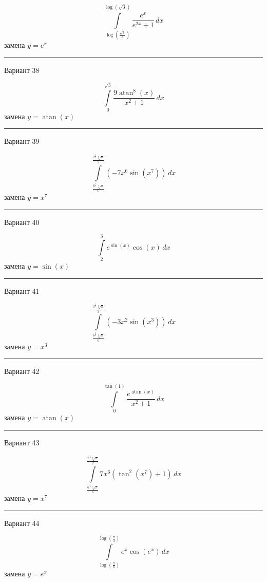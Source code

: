 \documentclass[11pt]{report}
\begin{document}
$$\int\limits_{\log{\left(\frac{\sqrt{3}}{3} \right)}}^{\log{\left(\sqrt{3} \right)}} \frac{e^{x}}{e^{2 x} + 1}\, dx$$
замена $y = e^{x}$



\rule{\textwidth}{.2mm}

Вариант 38

$$\int\limits_{0}^{\sqrt{3}} \frac{9 \operatorname{atan}^{8}{\left(x \right)}}{x^{2} + 1}\, dx$$
замена $y = \operatorname{atan}{\left(x \right)}$



\rule{\textwidth}{.2mm}

Вариант 39

$$\int\limits_{\frac{6^{\frac{6}{7}} \sqrt[7]{\pi}}{6}}^{\frac{2^{\frac{5}{7}} \sqrt[7]{\pi}}{2}} \left(- 7 x^{6} \sin{\left(x^{7} \right)}\right)\, dx$$
замена $y = x^{7}$



\rule{\textwidth}{.2mm}

Вариант 40

$$\int\limits_{2}^{3} e^{\sin{\left(x \right)}} \cos{\left(x \right)}\, dx$$
замена $y = \sin{\left(x \right)}$



\rule{\textwidth}{.2mm}

Вариант 41

$$\int\limits_{\frac{6^{\frac{2}{3}} \sqrt[3]{\pi}}{6}}^{\frac{3^{\frac{2}{3}} \sqrt[3]{\pi}}{3}} \left(- 3 x^{2} \sin{\left(x^{3} \right)}\right)\, dx$$
замена $y = x^{3}$



\rule{\textwidth}{.2mm}

Вариант 42

$$\int\limits_{0}^{\tan{\left(1 \right)}} \frac{e^{\operatorname{atan}{\left(x \right)}}}{x^{2} + 1}\, dx$$
замена $y = \operatorname{atan}{\left(x \right)}$



\rule{\textwidth}{.2mm}

Вариант 43

$$\int\limits_{\frac{6^{\frac{6}{7}} \sqrt[7]{\pi}}{6}}^{\frac{2^{\frac{5}{7}} \sqrt[7]{\pi}}{2}} 7 x^{6} \left(\tan^{2}{\left(x^{7} \right)} + 1\right)\, dx$$
замена $y = x^{7}$



\rule{\textwidth}{.2mm}

Вариант 44

$$\int\limits_{\log{\left(\frac{\pi}{6} \right)}}^{\log{\left(\frac{\pi}{3} \right)}} e^{x} \cos{\left(e^{x} \right)}\, dx$$
замена $y = e^{x}$
\end{document}
